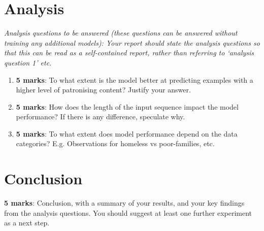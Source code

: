 \documentclass[11pt,a4paper]{article}
\begin{document}
\section{Analysis}

\emph{Analysis questions to be answered (these questions can be answered without training any additional models): Your report should state the analysis questions so that this can be read as a self-contained report, rather than referring to ‘analysis question 1’ etc.}

\begin{enumerate}
    \item \textbf{5 marks}: To what extent is the model better at predicting examples with a higher level of patronising content? Justify your answer.
    \item \textbf{5 marks}: How does the length of the input sequence impact the model performance? If there is any difference, speculate why.
    \item \textbf{5 marks}: To what extent does model performance depend on the data categories? E.g. Observations for homeless vs poor-families, etc.
\end{enumerate}

\section{Conclusion}

\textbf{5 marks}: Conclusion, with a summary of your results, and your key
findings from the analysis questions. You should suggest at least one further
experiment as a next step.

\clearpage

\appendix



\end{document}
